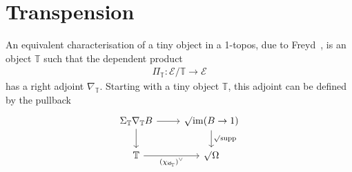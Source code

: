 \documentclass[10pt]{article}
\theoremstyle{definition}
\newcommand*{\id}{\mathsf{id}}
\newcommand{\Tiny}{\mathbb{T}}
\newcommand{\lockn}[1]{\mathcal{#1}}
\newcommand{\rform}[2]{\surd_{\lockn{#1}} #2}
\begin{document}
\section{Transpension}\label{sec:transpension}

An equivalent characterisation of a tiny object in a 1-topos, due to Freyd~\cite[Proposition 1.2]{yetter:tiny}, is an object $\Tiny$ such that the dependent product
\begin{align*}
\Pi_\Tiny : \mathcal{E}/\Tiny \to \mathcal{E}
\end{align*}
has a right adjoint $\nabla_\Tiny$. Starting with a tiny object $\Tiny$, this adjoint can be defined by the pullback
\[
\begin{tikzcd}
\Sigma_\Tiny \nabla_\Tiny B \ar[r] \ar[d] & \rform{} \mathrm{im}(B \to 1) \ar[d, "\rform{} \mathrm{supp}"] \\
\Tiny \ar[r, "{(\chi_{\id_\Tiny})^\vee}" swap] & \rform{} \Omega
\end{tikzcd}
\]
\end{document}

